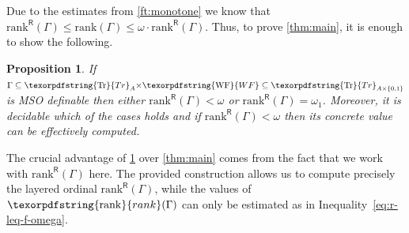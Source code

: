 \documentclass[11pt,a4paper]{amsart}
\theoremstyle{plain}
\newtheorem{prop}[thm]{Proposition}
\theoremstyle{definition}
\theoremstyle{defC}
\theoremstyle{thmC}
\theoremstyle{plain}
\numberwithin{equation}{section}
\numberwithin{equation}{section}
\numberwithin{figure}{section}
\newcommand{\ident}[1]{\ensuremath{\texorpdfstring{\mathrm{\mathnm{#1}}}{#1}}\xspace}
\newcommand{\mathnm}[1]{#1}
\newcommand{\trees}{\ident{Tr}}
\newcommand{\WF}{\ident{WF}}
\newcommand{\sR}{\mathsf{R}}
\newcommand{\limit}{\ident{rank}}
\newcommand{\limitR}{\mathrm{rank}}
\newcommand{\limitF}{\mathrm{rank}^{\sR}}
\begin{document}
Due to the estimates from \cref{ft:monotone}
we know that $\limitF(\Gamma)\leq \limitR(\Gamma) \leq \omega\cdot \limitF(\Gamma)$.
Thus, to prove \cref{thm:main}, it is enough to show the following.

\begin{prop}\label{pro:main-layers}
	If $\Gamma\subseteq \trees_A{\times} \WF\subseteq \trees_{A\times\{0,1\}}$ is MSO definable then either $\limitF(\Gamma)< \omega$ or $\limitF(\Gamma)=\omega_1$.
	Moreover, it is decidable which of the cases holds and if $\limitF(\Gamma)<\omega$ then its concrete value can be effectively computed.
\end{prop}

\noindent %
The crucial advantage of \cref{pro:main-layers} over \cref{thm:main} comes from the fact that we work with $\limitF(\Gamma)$ here.
The provided construction allows us to compute precisely the layered ordinal $\limitF(\Gamma)$, while the values of $\limit(\Gamma)$ can only be estimated as in Inequality~\eqref{eq:r-leq-f-omega}.
\end{document}
